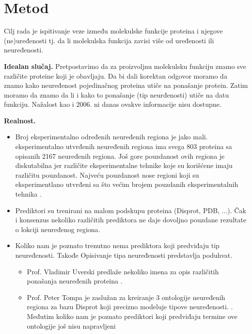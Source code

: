 \section {Metod}

Cilj rada je ispitivanje veze između molekulske funkcije proteina i njegove
(ne)uređenosti tj. da li molekulska funkcija zavisi više od uređenosti ili
neuređenosti.

\textbf{Idealan slučaj.} 
Pretpostavimo da za proizvoljnu molekulsku funkciju znamo sve različite
proteine koji je obavljaju.  Da bi dali korektan odgovor  moramo da znamo kako
neuređenost pojedinačnog proteina utiče na ponašanje protein.  Zatim moramo da
znamo da li i kako to ponašanje (tip neurđenosti) utiče na datu funkciju.
Nažalost kao i 2006. ni danas ovakve informacije nisu dostupne.

\textbf{Realnost.} 
\begin{itemize}
  \item Broj eksperimentalno određenih neuređenih regiona je jako mali.
     eksperimentalno utvrđenih neuređenih regiona ima
    svega 803 proteina sa opisanih 2167 neuređenih regiona. Još gore pouzdanost
    ovih regiona je diskutabilna jer različite eksperimentalne tehnike koje su
    korišćene imaju različitu pouzdanost. Najveću pouzdanost nose regioni koji
    su eksperimentlano utvrđeni sa što većim brojem pouzdanih eksperimentalnih
    tehnika \parencite{disprot}. 
  \item Prediktori su trenirani na malom podskupu proteina (Disprot, PDB, ...).
    Čak i konsenzus nekoliko različitih prediktora ne daje dovoljno pouzdane
    rezultate o lokciji neuređenog regiona\parencite{Mitic}.
  \item Koliko nam je poznato trenutno nema prediktora koji predviđaju tip
    neuređenosti. Takođe Opisivanje tipa neuređenosti predstavlja poduhvat.
    \begin{itemize}
      \item Prof. Vladimir Uverski predlaže nekoliko imena za opis različitih
        ponašanja neuređenih proteina 
        \parencite{Uversky2017}.
      \item Prof. Peter Tompa je zaslužan za kreiranje 3 ontologije neuređenih
        regiona za bazu Disprot koji precizno modeluje tipove
        neuređenosti\parencite{disprot}.  .  Međutim koliko nam je poznato
        prediktori koji predviđaju termine ove ontologije još nisu napravljeni
    \end{itemize}

\end{itemize}

